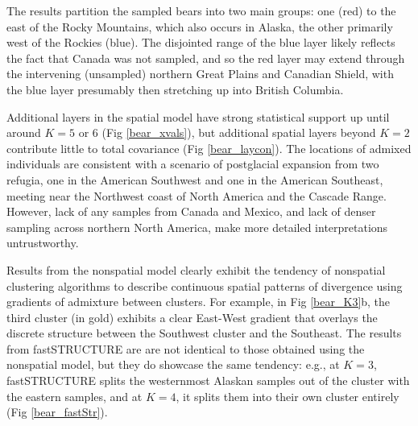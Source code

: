 \documentclass[10pt,letterpaper]{article}
\begin{document}
The results partition the sampled bears into two main groups:
one (red) to the east of the Rocky Mountains, 
which also occurs in Alaska,
the other primarily west of the Rockies (blue).
The disjointed range of the blue layer likely reflects the fact
that Canada was not sampled, 
and so the red layer may extend
through the intervening (unsampled) northern Great Plains and Canadian Shield, 
with the blue layer presumably then stretching up into British Columbia.

Additional layers in the spatial model have strong statistical support 
up until around $K=5$ or 6 (Fig \ref{bear_xvals}),
but additional spatial layers beyond $K=2$ contribute little to total covariance (Fig \ref{bear_laycon}).
The locations of admixed individuals 
are consistent with a scenario of postglacial expansion from two refugia, 
one in the American Southwest and one in the American Southeast, 
meeting near the Northwest coast of North America and the Cascade Range.
However, lack of any samples from Canada and Mexico, 
and lack of denser sampling across northern North America, 
make more detailed interpretations untrustworthy.

Results from the nonspatial model clearly exhibit the tendency 
of nonspatial clustering algorithms to describe continuous spatial patterns of divergence 
using gradients of admixture between clusters.
For example, in Fig \ref{bear_K3}b, 
the third cluster (in gold) exhibits a clear East-West gradient that 
overlays the discrete structure between the Southwest cluster and the Southeast.
The results from fastSTRUCTURE are are not identical to 
those obtained using the nonspatial model, 
but they do showcase the same tendency: 
e.g., at $K=3$, fastSTRUCTURE splits the westernmost Alaskan samples 
out of the cluster with the eastern samples, 
and at $K=4$, it splits them into their own cluster entirely (Fig \ref{bear_fastStr}).
\end{document}
